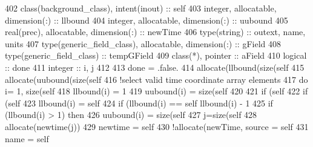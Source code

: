 \begin{DoxyCode}
402     \textcolor{keywordtype}{class}(background\_class), \textcolor{keywordtype}{intent(inout)} :: self
403     \textcolor{keywordtype}{integer}, \textcolor{keywordtype}{allocatable}, \textcolor{keywordtype}{dimension(:)} :: llbound
404     \textcolor{keywordtype}{integer}, \textcolor{keywordtype}{allocatable}, \textcolor{keywordtype}{dimension(:)} :: uubound
405     \textcolor{keywordtype}{real(prec)}, \textcolor{keywordtype}{allocatable}, \textcolor{keywordtype}{dimension(:)} :: newTime
406     \textcolor{keywordtype}{type}(string) :: outext, name, units
407     \textcolor{keywordtype}{type}(generic\_field\_class), \textcolor{keywordtype}{allocatable}, \textcolor{keywordtype}{dimension(:)} :: gField
408     \textcolor{keywordtype}{type}(generic\_field\_class) :: tempGField
409     \textcolor{keywordtype}{class}(*), \textcolor{keywordtype}{pointer} :: aField
410     \textcolor{keywordtype}{logical} :: done
411     \textcolor{keywordtype}{integer} :: i, j
412 
413     done = .false.
414     \textcolor{keyword}{allocate}(llbound(\textcolor{keyword}{size}(self%
415     \textcolor{keyword}{allocate}(uubound(\textcolor{keyword}{size}(self%
416     \textcolor{comment}{!select valid time coordinate array elements}
417     \textcolor{keywordflow}{do} i= 1, \textcolor{keyword}{size}(self%
418         llbound(i) = 1
419         uubound(i) = \textcolor{keyword}{size}(self%
420 
421         \textcolor{keywordflow}{if} (self%
422             \textcolor{keywordflow}{if} (self%
423                 llbound(i) = self%
424                 \textcolor{keywordflow}{if} (llbound(i) == self%
      llbound(i) - 1
425                 \textcolor{keywordflow}{if} (llbound(i) > 1) \textcolor{keywordflow}{then}
426                     uubound(i) = \textcolor{keyword}{size}(self%
427                     j=\textcolor{keyword}{size}(self%
428                     \textcolor{keyword}{allocate}(newtime(j))
429                     newtime = self%
430                     \textcolor{comment}{!allocate(newTime, source = self%
431                     name = self%
}
\end{DoxyCode}
